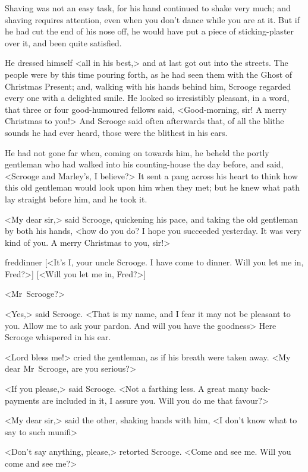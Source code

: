 Shaving was not an easy task, for his hand continued to shake very much; and shaving requires attention, even when you don't dance while you are at it. But if he had cut the end of his nose off, he would have put a piece of sticking-plaster over it, and been quite satisfied.

He dressed himself <all in his best,> and at last got out into the streets. The people were by this time pouring forth, as he had seen them with the Ghost of Christmas Present; and, walking with his hands behind him, Scrooge regarded every one with a delighted smile. He looked so irresistibly pleasant, in a word, that three or four good-humoured fellows said, <Good-morning, sir! A merry Christmas to you!> And Scrooge said often afterwards that, of all the blithe sounds he had ever heard, those were the blithest in his ears.

He had not gone far when, coming on towards him, he beheld the portly gentleman who had walked into his counting-house the day before, and said, <Scrooge and Marley's, I believe?> It sent a pang across his heart to think how this old gentleman would look upon him when they met; but he knew what path lay straight before him, and he took it.

<My dear sir,> said Scrooge, quickening his pace, and taking the old gentleman by both his hands, <how do you do? I hope you succeeded yesterday. It was very kind of you. A merry Christmas to you, sir!>

\begin{colorbigpic}
	[\basicscale]
	{freddinner}
	[<It's I, your uncle Scrooge. I have come to dinner. Will you let me in, Fred?>]
	[<Will you let me in, Fred?>]
\end{colorbigpic}


<Mr~Scrooge?>

<Yes,> said Scrooge. <That is my name, and I fear it may not be pleasant to you. Allow me to ask your pardon. And will you have the goodness\longdash> Here Scrooge whispered in his ear.

<Lord bless me!> cried the gentleman, as if his breath were taken away. <My dear Mr~Scrooge, are you serious?>

<If you please,> said Scrooge. <Not a farthing less. A great many back-payments are included in it, I assure you. Will you do me that favour?>

<My dear sir,> said the other, shaking hands with him, <I don't know what to say to such munifi\longdash>

<Don't say anything, please,> retorted Scrooge. <Come and see me. Will you come and see me?>

